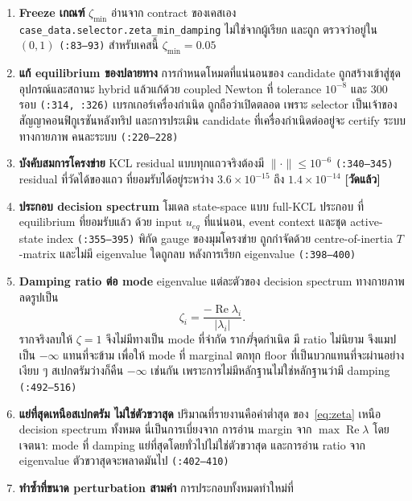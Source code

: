\documentclass[12pt,a4paper]{article}
\theoremstyle{remark}
\newcommand{\zmin}{\zeta_{\min}}
\newcommand{\code}[1]{\texttt{\small #1}}
\newcommand{\measured}{\textcolor{ok}{\textbf{[วัดแล้ว]}}}
\begin{document}
\begin{enumerate}[leftmargin=1.9em]
\item \textbf{Freeze เกณฑ์} $\zmin$ อ่านจาก contract ของเคสเอง
      \code{case\_data.selector.zeta\_min\_damping} ไม่ใช่จากผู้เรียก และถูก
      ตรวจว่าอยู่ใน $(0,1)$ \code{(:83--93)} สำหรับเคสนี้ $\zmin = 0.05$
\item \textbf{แก้ equilibrium ของปลายทาง} การกำหนดโหมดที่แน่นอนของ candidate
      ถูกสร้างเข้าสู่ชุดอุปกรณ์และสถานะ hybrid แล้วแก้ด้วย coupled Newton
      ที่ tolerance $10^{-8}$ และ 300 รอบ \code{(:314, :326)} เบรกเกอร์เครื่องกำเนิด
      ถูกถือว่าเปิดตลอด เพราะ selector เป็นเจ้าของสัญญาคอนฟิกูเรชันหลังทริป
      และการประเมิน candidate ที่เครื่องกำเนิดต่ออยู่จะ certify ระบบทางกายภาพ
      คนละระบบ \code{(:220--228)}
\item \textbf{บังคับสมการโครงข่าย} KCL residual แบบทุกแถวจริงต้องมี
      $\lVert \cdot\rVert \le 10^{-6}$ \code{(:340--345)} residual ที่วัดได้ของแถว
      ที่ยอมรับได้อยู่ระหว่าง $3.6\times10^{-15}$ ถึง $1.4\times10^{-14}$ \measured
\item \textbf{ประกอบ decision spectrum} โมเดล state-space แบบ full-KCL ประกอบ
      ที่ equilibrium ที่ยอมรับแล้ว ด้วย input $u_{eq}$ ที่แน่นอน, event context
      และชุด active-state index \code{(:355--395)} พิกัด gauge ของมุมโครงข่าย
      ถูกกำจัดด้วย centre-of-inertia $T$-matrix และไม่มี eigenvalue ใดถูกลบ
      หลังการเรียก eigenvalue \code{(:398--400)}
\item \textbf{Damping ratio ต่อ mode} eigenvalue แต่ละตัวของ decision spectrum
      ทางกายภาพลดรูปเป็น
      \begin{equation}
      \zeta_i = \frac{-\operatorname{Re}\lambda_i}{|\lambda_i|}.
      \label{eq:zeta}
      \end{equation}
      รากจริงลบให้ $\zeta = 1$ จึงไม่มีทางเป็น mode ที่จำกัด ราก\emph{ที่}จุดกำเนิด
      มี ratio ไม่นิยาม จึงแมปเป็น $-\infty$ แทนที่จะข้าม เพื่อให้ mode ที่ marginal
      ตกทุก floor ที่เป็นบวกแทนที่จะผ่านอย่างเงียบ ๆ สเปกตรัมว่างก็คืน $-\infty$
      เช่นกัน เพราะการไม่มีหลักฐานไม่ใช่หลักฐานว่ามี damping \code{(:492--516)}
\item \textbf{แย่ที่สุดเหนือสเปกตรัม ไม่ใช่ตัวขวาสุด} ปริมาณที่รายงานคือค่าต่ำสุด
      ของ~\eqref{eq:zeta} เหนือ decision spectrum ทั้งหมด นี่เป็นการเบี่ยงจาก
      การอ่าน margin จาก $\max\operatorname{Re}\lambda$ โดยเจตนา: mode ที่
      damping แย่ที่สุดโดยทั่วไปไม่ใช่ตัวขวาสุด และการอ่าน ratio จาก eigenvalue
      ตัวขวาสุดจะพลาดมันไป \code{(:402--410)}
\item \textbf{ทำซ้ำที่ขนาด perturbation สามค่า} การประกอบทั้งหมดทำใหม่ที่

\end{enumerate}
\end{document}
